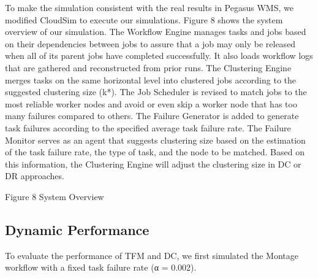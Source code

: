\documentclass{IOS-Book-Article}
\begin{document}
To make the simulation consistent with the real results in Pegasus WMS, we modified CloudSim to execute our simulations.  Figure 8 shows the system overview of our simulation. The Workflow Engine manages tasks and jobs based on their dependencies between jobs to assure that a job may only be released when all of its parent jobs have completed successfully. It also loads workflow logs that are gathered and reconstructed from prior runs. The Clustering Engine merges tasks on the same horizontal level into clustered jobs according to the suggested clustering size (k*). The Job Scheduler is revised to match jobs to the most reliable worker nodes and avoid or even skip a worker node that has too many failures compared to others. The Failure Generator is added to generate task failures according to the specified average task failure rate. The Failure Monitor serves as an agent that suggests clustering size based on the estimation of the task failure rate, the type of task, and the node to be matched. Based on this information, the Clustering Engine will adjust the clustering size in DC or DR approaches.
 
Figure 8	 System Overview
\subsection{Dynamic Performance}
To evaluate the performance of TFM and DC, we first simulated the Montage workflow with a fixed task failure rate (α = 0.002).  
 
\end{document}
